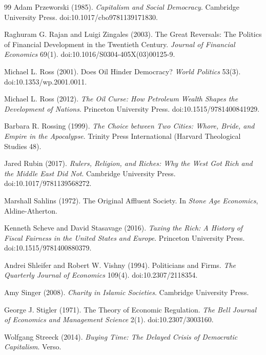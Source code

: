 \documentclass[11pt,letterpaper]{article}
\theoremstyle{definition}
\theoremstyle{remark}
\begin{document}
\begin{thebibliography}{99}
Adam Przeworski (1985). \emph{Capitalism and Social Democracy}. Cambridge University Press. doi:10.1017/cbo9781139171830.

Raghuram G. Rajan and Luigi Zingales (2003). The Great Reversals: The Politics of Financial Development in the Twentieth Century. \emph{Journal of Financial Economics} 69(1). doi:10.1016/S0304-405X(03)00125-9.

Michael L. Ross (2001). Does Oil Hinder Democracy? \emph{World Politics} 53(3). doi:10.1353/wp.2001.0011.

Michael L. Ross (2012). \emph{The Oil Curse: How Petroleum Wealth Shapes the Development of Nations}. Princeton University Press. doi:10.1515/9781400841929.

Barbara R. Rossing (1999). \emph{The Choice between Two Cities: Whore, Bride, and Empire in the Apocalypse}. Trinity Press International (Harvard Theological Studies 48).

Jared Rubin (2017). \emph{Rulers, Religion, and Riches: Why the West Got Rich and the Middle East Did Not}. Cambridge University Press. doi:10.1017/9781139568272.

Marshall Sahlins (1972). The Original Affluent Society. In \emph{Stone Age Economics}, Aldine-Atherton.

Kenneth Scheve and David Stasavage (2016). \emph{Taxing the Rich: A History of Fiscal Fairness in the United States and Europe}. Princeton University Press. doi:10.1515/9781400880379.

Andrei Shleifer and Robert W. Vishny (1994). Politicians and Firms. \emph{The Quarterly Journal of Economics} 109(4). doi:10.2307/2118354.

Amy Singer (2008). \emph{Charity in Islamic Societies}. Cambridge University Press.

George J. Stigler (1971). The Theory of Economic Regulation. \emph{The Bell Journal of Economics and Management Science} 2(1). doi:10.2307/3003160.

Wolfgang Streeck (2014). \emph{Buying Time: The Delayed Crisis of Democratic Capitalism}. Verso.


\end{thebibliography}
\end{document}
